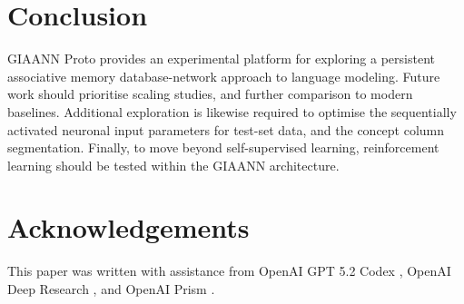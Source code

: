 \documentclass[11pt]{article}
\begin{document}











\section{Conclusion}
GIAANN Proto provides an experimental platform for exploring a persistent associative memory database-network approach to language modeling.
Future work should prioritise scaling studies, and further comparison to modern baselines. Additional exploration is likewise required to optimise the sequentially activated neuronal input parameters for test-set data, and the concept column segmentation. Finally, to move beyond self-supervised learning, reinforcement learning should be tested within the GIAANN architecture.

\section{Acknowledgements}

This paper was written with assistance from OpenAI GPT 5.2 Codex \citep{openai2025gpt52codex}, OpenAI Deep Research \citep{openai2025deepresearch}, and OpenAI Prism \citep{openai2026prism}.





\end{document}
